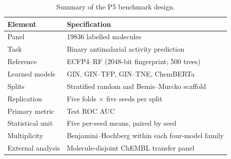 \begin{table}[t]
\centering
\caption{Summary of the P5 benchmark design.}
\label{tab:study_design}
\begin{tabular}{ll}
\toprule
Element & Specification \\
\midrule
Panel & \num{19836} labelled molecules \\
Task & Binary antimalarial activity prediction \\
Reference & ECFP4--RF (\num{2048}-bit fingerprint; \num{500} trees) \\
Learned models & GIN, GIN--TFP, GIN--TNE, ChemBERTa \\
Splits & Stratified random and Bemis--Murcko scaffold \\
Replication & Five folds $\times$ five seeds per split \\
Primary metric & Test ROC AUC \\
Statistical unit & Five per-seed means, paired by seed \\
Multiplicity & Benjamini--Hochberg within each four-model family \\
External analysis & Molecule-disjoint ChEMBL transfer panel \\
\bottomrule
\end{tabular}
\end{table}
